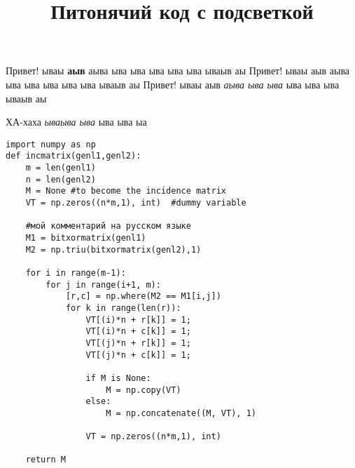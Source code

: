 \documentclass[11pt]{article}
\title{Питонячий код с подсветкой}
\begin{document}
Привет! ываы \textbf{аыв }аыва ыва ыва ыва ыва ыва ываыв аы
Привет! ываы аыв аыва ыва ыва ыва ыва ыва ываыв аы
Привет! ываы аыв \emph{аыва ыва ыва} ыва ыва ыва ываыв аы


{\Huge ХА-хаха \emph{ываыва ыва }ыва ыва ыа}


\begin{verbatim}
import numpy as np
def incmatrix(genl1,genl2):
    m = len(genl1)
    n = len(genl2)
    M = None #to become the incidence matrix
    VT = np.zeros((n*m,1), int)  #dummy variable

    #мой комментарий на русском языке
    M1 = bitxormatrix(genl1)
    M2 = np.triu(bitxormatrix(genl2),1)

    for i in range(m-1):
        for j in range(i+1, m):
            [r,c] = np.where(M2 == M1[i,j])
            for k in range(len(r)):
                VT[(i)*n + r[k]] = 1;
                VT[(i)*n + c[k]] = 1;
                VT[(j)*n + r[k]] = 1;
                VT[(j)*n + c[k]] = 1;

                if M is None:
                    M = np.copy(VT)
                else:
                    M = np.concatenate((M, VT), 1)

                VT = np.zeros((n*m,1), int)

    return M
\end{verbatim}
\paragraph{}
\end{document}
